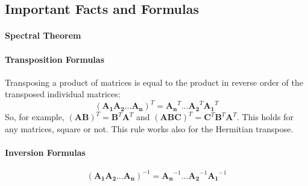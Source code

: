 

\subsection{Important Facts and Formulas}

\paragraph{Spectral Theorem}

\paragraph{Transposition Formulas}
Transposing a product of matrices is equal to the product in reverse order of the transposed individual matrices:
\begin{equation}
(\mathbf{A_1 A_2 \ldots  A_n})^T = \mathbf{A_n}^T \ldots \mathbf{A_2}^T \mathbf{A_1}^T
\end{equation}
So, for example, $(\mathbf{A} \mathbf{B})^T =  \mathbf{B}^T \mathbf{A}^T$ and  $(\mathbf{A} \mathbf{B} \mathbf{C})^T = \mathbf{C}^T \mathbf{B}^T  \mathbf{A}^T$. This holds for any matrices, square or not. This rule works also for the Hermitian transpose.


\paragraph{Inversion Formulas}
\begin{equation}
(\mathbf{A_1 A_2 \ldots  A_n})^{-1} = \mathbf{A_n}^{-1} \ldots \mathbf{A_2}^{-1} \mathbf{A_1}^{-1}
\end{equation}

